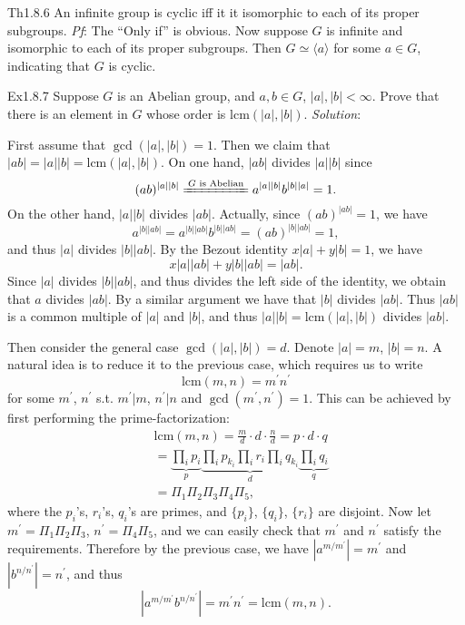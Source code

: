 \documentclass{article}
\newcommand{\lcm}{\text{lcm}}
\begin{document}
\begin{Th}{Th1.8.6}
    An infinite group is cyclic iff it it isomorphic to each of its proper subgroups.
    \tcblower
    \textit{Pf}: The ``Only if'' is obvious. Now suppose $G$ is infinite and isomorphic to each of its proper subgroups. Then $G\simeq \langle a\rangle$ for some $a\in G$, indicating that $G$ is cyclic.
\end{Th}

\begin{Th}{Ex1.8.7}
    Suppose $G$ is an Abelian group, and $a, b\in G$, $|a|, |b| < \infty$. Prove that there is an element in $G$ whose order is $\lcm(|a|, |b|)$.
    \tcblower
    \textit{Solution}: 
    \begin{compactenum}
        \item First assume that $\gcd(|a|, |b|) = 1$. Then we claim that $|ab| = |a||b| = \lcm(|a|, |b|)$. On one hand, $|ab|$ divides $|a||b|$ since 
        $$ (ab)^{|a||b|} \xlongequal{G \text{ is Abelian}} a^{|a||b|}b^{|b||a|} = 1. $$
        On the other hand, $|a||b|$ divides $|ab|$. Actually, since $(ab)^{|ab|} = 1$, we have
        $$ a^{|b||ab|} = a^{|b||ab|}b^{|b||ab|} = (ab)^{|b||ab|} = 1, $$
        and thus $|a|$ divides $|b||ab|$. By the Bezout identity $x|a| + y|b| = 1$, we have
        $$ x|a||ab| + y|b||ab| = |ab|. $$
        Since $|a|$ divides $|b||ab|$, and thus divides the left side of the identity, we obtain that $a$ divides $|ab|$. By a similar argument we have that $|b|$ divides $|ab|$. Thus $|ab|$ is a common multiple of $|a|$ and $|b|$, and thus $|a||b| = \lcm(|a|, |b|)$ divides $|ab|$.
        \item Then consider the general case $\gcd(|a|, |b|) = d$. Denote $|a| = m$, $|b| = n$. A natural idea is to reduce it to the previous case, which requires us to write 
        $$ \lcm(m,n) = m^\prime n^\prime $$
        for some $m^\prime$, $n^\prime$ s.t. $m^\prime|m$, $n^\prime|n$ and $\gcd(m^\prime, n^\prime) = 1$. This can be achieved by first performing the prime-factorization:
        $$ \begin{aligned}
            &\lcm(m,n) = \frac{m}{d}\cdot d\cdot\frac{n}{d} = p\cdot d\cdot q \\
            &= \underbrace{\prod_{i} p_i}_p \underbrace{\prod_{i} p_{k_i} \prod_{i} r_i \prod_{i} q_{k_i}}_d \underbrace{\prod_{i} q_i}_q \\
            &= \Pi_1\Pi_2\Pi_3\Pi_4\Pi_5,
        \end{aligned} $$
        where the $p_i$'s, $r_i$'s, $q_i$'s are primes, and $\{p_i\}$, $\{q_i\}$, $\{r_i\}$ are disjoint. Now let $m^\prime = \Pi_1\Pi_2\Pi_3$, $n^\prime = \Pi_4\Pi_5$, and we can easily check that $m^\prime$ and $n^\prime$ satisfy the requirements. Therefore by the previous case, we have $|a^{m/m^\prime}| = m^\prime$ and $|b^{n/n^\prime}| = n^\prime$, and thus
        $$ |a^{m/m^\prime}b^{n/n^\prime}| = m^\prime n^\prime = \lcm(m,n). $$
    \end{compactenum}
\end{Th}
\end{document}
